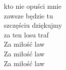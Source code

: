 \begin{flushleft}
\hspace{0.9cm}kto nie opuści mnie\\
\hspace{0.9cm}zawsze będzie tu\\
\hspace{0.9cm}szczęściu dziękujmy\\
\hspace{0.9cm}za ten losu traf\\
\hspace{0.9cm}Za miłość law\\
\hspace{0.9cm}Za miłość law\\
\hspace{0.9cm}Za miłość law\\
\end{flushleft}
\newpage
